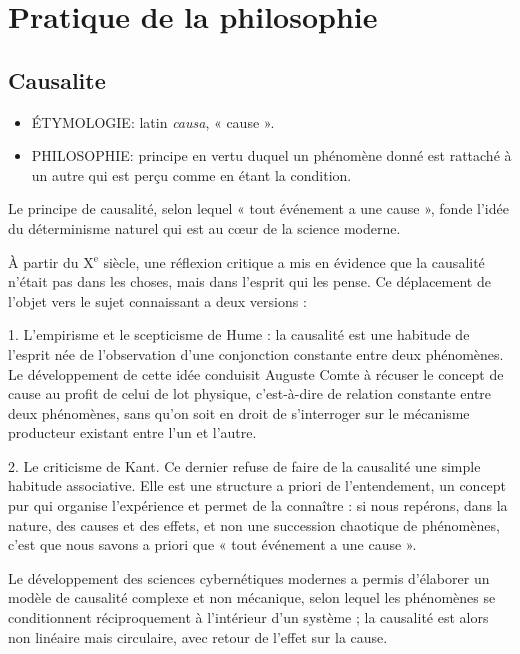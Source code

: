 
\section{Pratique de la philosophie}

\subsection{Causalite}

\begin{itemize}[leftmargin=1cm, label=, itemsep=1pt]
\item {\footnotesize ÉTYMOLOGIE}: latin {\it causa}, « cause ».
\item {\footnotesize PHILOSOPHIE}: principe
en vertu duquel un phénomène
donné est rattaché à un autre qui est
perçu comme en étant la condition.
\end{itemize}

Le principe de causalité, selon lequel
« tout événement a une cause », fonde
l'idée du déterminisme naturel qui est au
cœur de la science moderne.

À partir du {\footnotesize X}$^\text{e}$ siècle, une réflexion critique
a mis en évidence que la causalité
n'était pas dans les choses, mais dans
l'esprit qui les pense. Ce déplacement
de l’objet vers le sujet connaissant a
deux versions :

1. L'empirisme et le scepticisme de
Hume : la causalité est une habitude de
l'esprit née de l'observation d’une
conjonction constante entre deux phénomènes.
Le développement de cette
idée conduisit Auguste Comte à récuser
le concept de cause au profit de celui de
lot physique, c'est-à-dire de relation
constante entre deux phénomènes, sans
qu'on soit en droit de s'interroger sur le
mécanisme producteur existant entre
l'un et l’autre.
%

2. Le criticisme de Kant. Ce dernier
refuse de faire de la causalité une simple
habitude associative. Elle est une structure
a priori de l’entendement, un
concept pur qui organise l'expérience et
permet de la connaître : si nous repérons,
dans la nature, des causes et des effets, et
non une succession chaotique de phénomènes,
c’est que nous savons a priori
que « tout événement a une cause ».

Le développement des sciences cybernétiques
modernes a permis d'élaborer
un modèle de causalité complexe et non
mécanique, selon lequel les phénomènes
se conditionnent réciproquement
à l’intérieur d’un système ; la causalité
est alors non linéaire mais circulaire,
avec retour de l'effet sur la cause.

